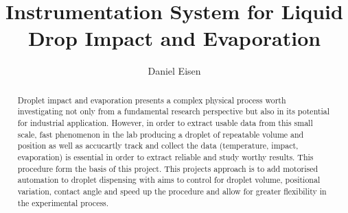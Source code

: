 \documentclass[11pt, a4paper, oneside]{report}
\title{Instrumentation System for Liquid Drop Impact and Evaporation}
\author{Daniel Eisen}
\date{}
\begin{document}
\frontmatter

\begin{abstract}

    Droplet impact and evaporation presents a complex physical process worth investigating not only from a fundamental research perspective but also in its potential for industrial application. However, in order to extract usable data from this small scale, fast phenomenon in the lab producing a droplet of repeatable volume and position as well as accucartly track and collect the data (temperature, impact, evaporation) is essential in order to extract reliable and study worthy results. This procedure form the basis of this project.
    This projects approach is to add motorised automation to droplet dispensing with aims to control for droplet volume, positional variation, contact angle and speed up the procedure and allow for greater flexibility in the experimental process.


\end{abstract}


\maketitle



\tableofcontents


\mainmatter







\backmatter



\end{document}
